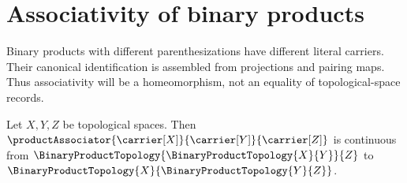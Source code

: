 \section{Associativity of binary products}




Binary products with different parenthesizations have different literal
carriers.  Their canonical identification is assembled from projections and
pairing maps.  Thus associativity will be a homeomorphism, not an equality of
topological-space records.


\begin{theorem}\label{product_associator_continuous}
    Let $X,Y,Z$ be topological spaces.
    Then $\productAssociator{\carrier[X]}{\carrier[Y]}{\carrier[Z]}$
        is continuous from
        $\BinaryProductTopology{\BinaryProductTopology{X}{Y}}{Z}$ to
        $\BinaryProductTopology{X}{\BinaryProductTopology{Y}{Z}}$.
\end{theorem}
